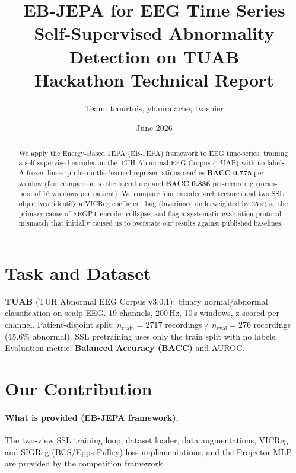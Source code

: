 \documentclass[10pt,a4paper]{article}
\title{\textbf{EB-JEPA for EEG Time Series}\\
  \large Self-Supervised Abnormality Detection on TUAB\\[4pt]
  \normalsize Hackathon Technical Report}
\author{Team: tcourtois, yhammache, tvasnier}
\date{June 2026}
\begin{document}
\maketitle
\begin{abstract}
We apply the Energy-Based JEPA (EB-JEPA) framework to EEG time-series, training a
self-supervised encoder on the TUH Abnormal EEG Corpus (TUAB) with no labels.
A frozen linear probe on the learned representations reaches
\textbf{BACC 0.775} per-window (fair comparison to the literature)
and \textbf{BACC 0.836} per-recording (mean-pool of 16 windows per patient).
We compare four encoder architectures and two SSL objectives, identify a
VICReg coefficient bug (invariance underweighted by 25$\times$) as the primary
cause of EEGPT encoder collapse, and flag a systematic evaluation protocol
mismatch that initially caused us to overstate our results against published baselines.
\end{abstract}

\section{Task and Dataset}
\textbf{TUAB} (TUH Abnormal EEG Corpus v3.0.1): binary normal/abnormal classification
on scalp EEG. 19 channels, 200\,Hz, 10\,s windows, z-scored per channel.
Patient-disjoint split: $n_{\text{train}}=2717$ recordings / $n_{\text{eval}}=276$ recordings
(45.6\% abnormal). SSL pretraining uses only the train split with no labels.
Evaluation metric: \textbf{Balanced Accuracy (BACC)} and AUROC.

\section{Our Contribution}

\paragraph{What is provided (EB-JEPA framework).}
The two-view SSL training loop, dataset loader, data augmentations, VICReg and SIGReg
(BCS/Epps-Pulley) loss implementations, and the Projector MLP are provided by the
competition framework.
\end{document}
